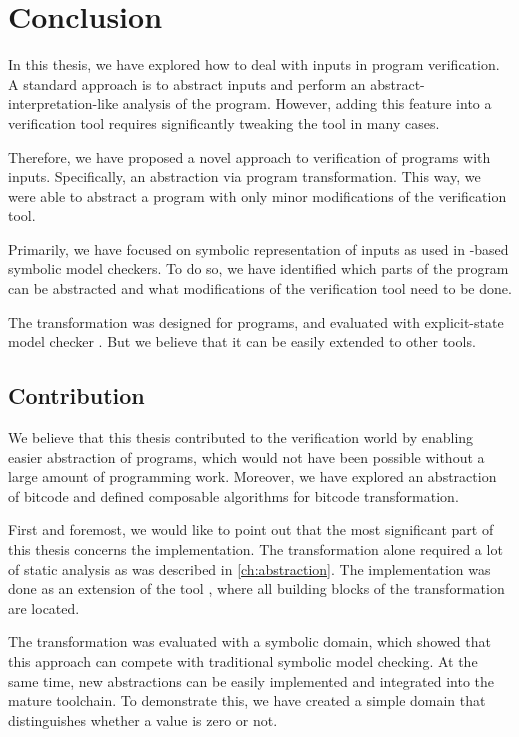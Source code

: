 \chapter{Conclusion}\label{ch:conclusion}

In this thesis, we have explored how to deal with inputs in program
verification. A standard approach is to abstract inputs and perform an
abstract-interpretation-like analysis of the program. However, adding this feature into a
verification tool requires significantly tweaking the tool in many cases.

Therefore, we have proposed a novel approach to verification of programs with
inputs. Specifically, an abstraction via program transformation. This way, we
were able to abstract a program with only minor modifications of the verification
tool.

Primarily, we have focused on symbolic representation of inputs as used in \SMT-based
symbolic model checkers. To do so, we have identified which parts of the program can be
abstracted and what modifications of the verification tool need to be done.

The transformation was designed for \LLVM{} programs, and evaluated with
explicit-state model checker \DIVINE. But we believe that it can be easily extended
to other tools.

\section{Contribution}
We believe that this thesis contributed to the verification world by enabling
easier abstraction of programs, which would not have been possible without a
large amount of programming work. Moreover, we have explored an abstraction
of \LLVM bitcode and defined composable algorithms for bitcode transformation.

First and foremost, we would like to point out that the most significant part of
this thesis concerns the implementation. The transformation alone required
a lot of static analysis as was described in \autoref{ch:abstraction}. The
implementation was done as an extension of the tool \LART, where all building
blocks of the transformation are located.

The transformation was evaluated with a symbolic domain,
which showed that this approach can compete with traditional symbolic model
checking. At the same time, new abstractions can be easily implemented and
integrated into the mature \DIVINE toolchain. To demonstrate this, we have created a
simple domain that distinguishes whether a value is zero or not.

